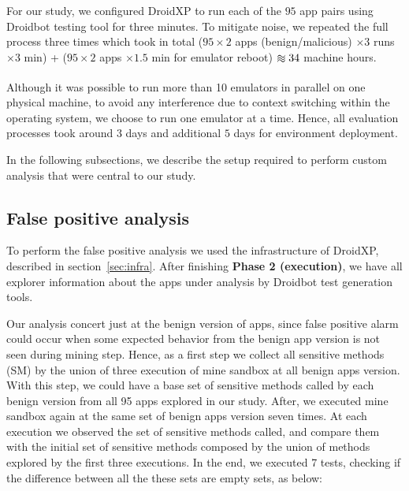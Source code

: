 For our study, we configured DroidXP to run each of the $95$ app pairs using Droidbot testing tool for three minutes. To mitigate noise, we repeated the full process three times which took in total ($95 \times 2$ apps (benign/malicious) $\times 3$ runs $\times 3$ min) + ($95 \times 2$ apps $\times 1.5$ min for emulator reboot) $\apeq 34$ machine hours.

Although it was possible to run more than 10 emulators in parallel on one physical machine, to avoid any interference due to context switching within the operating system, we choose to run one emulator at a time. Hence, all evaluation processes took around $3$ days and additional $5$ days for environment deployment.

In the following subsections, we describe the setup required to perform custom analysis that were central to our study.

\subsection{False positive analysis} \label{sec:falsePositive}

To perform the false positive analysis we used the infrastructure of DroidXP, described in section~\ref{sec:infra}. After finishing \textbf{Phase 2 (execution)}, we have all explorer information about the apps under analysis by Droidbot test generation tools.

Our analysis concert just at the benign version of apps, since false positive alarm could occur when some expected behavior from the benign app version is not seen during mining step. Hence, as a first step we collect all sensitive methods (SM) by the union of three execution of mine sandbox at all benign apps version. With this step, we could have a base set of sensitive methods called by each benign version from all 95 apps explored in our study. After, we executed mine sandbox again at the same set of benign apps version seven times. At each execution we observed the set of sensitive methods called, and compare them with the initial set of sensitive methods composed by the union of methods explored by the first three executions. In the end, we executed 7 tests, checking if the difference between all the these sets are empty sets, as below:\newline

